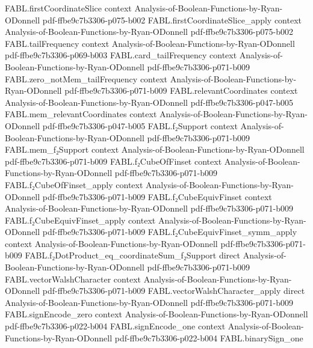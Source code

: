 \begin{theorem}
\proofstep
  {FABL.firstCoordinateSlice}
  {context}
  {Analysis-of-Boolean-Functions-by-Ryan-ODonnell}
  {pdf-ffbe9c7b3306-p075-b002}
\proofstep
  {FABL.firstCoordinateSlice_apply}
  {context}
  {Analysis-of-Boolean-Functions-by-Ryan-ODonnell}
  {pdf-ffbe9c7b3306-p075-b002}
\proofstep
  {FABL.tailFrequency}
  {context}
  {Analysis-of-Boolean-Functions-by-Ryan-ODonnell}
  {pdf-ffbe9c7b3306-p069-b003}
\proofstep
  {FABL.card_tailFrequency}
  {context}
  {Analysis-of-Boolean-Functions-by-Ryan-ODonnell}
  {pdf-ffbe9c7b3306-p071-b009}
\proofstep
  {FABL.zero_notMem_tailFrequency}
  {context}
  {Analysis-of-Boolean-Functions-by-Ryan-ODonnell}
  {pdf-ffbe9c7b3306-p071-b009}
\proofstep
  {FABL.relevantCoordinates}
  {context}
  {Analysis-of-Boolean-Functions-by-Ryan-ODonnell}
  {pdf-ffbe9c7b3306-p047-b005}
\proofstep
  {FABL.mem_relevantCoordinates}
  {context}
  {Analysis-of-Boolean-Functions-by-Ryan-ODonnell}
  {pdf-ffbe9c7b3306-p047-b005}
\proofstep
  {FABL.f₂Support}
  {context}
  {Analysis-of-Boolean-Functions-by-Ryan-ODonnell}
  {pdf-ffbe9c7b3306-p071-b009}
\proofstep
  {FABL.mem_f₂Support}
  {context}
  {Analysis-of-Boolean-Functions-by-Ryan-ODonnell}
  {pdf-ffbe9c7b3306-p071-b009}
\proofstep
  {FABL.f₂CubeOfFinset}
  {context}
  {Analysis-of-Boolean-Functions-by-Ryan-ODonnell}
  {pdf-ffbe9c7b3306-p071-b009}
\proofstep
  {FABL.f₂CubeOfFinset_apply}
  {context}
  {Analysis-of-Boolean-Functions-by-Ryan-ODonnell}
  {pdf-ffbe9c7b3306-p071-b009}
\proofstep
  {FABL.f₂CubeEquivFinset}
  {context}
  {Analysis-of-Boolean-Functions-by-Ryan-ODonnell}
  {pdf-ffbe9c7b3306-p071-b009}
\proofstep
  {FABL.f₂CubeEquivFinset_apply}
  {context}
  {Analysis-of-Boolean-Functions-by-Ryan-ODonnell}
  {pdf-ffbe9c7b3306-p071-b009}
\proofstep
  {FABL.f₂CubeEquivFinset_symm_apply}
  {context}
  {Analysis-of-Boolean-Functions-by-Ryan-ODonnell}
  {pdf-ffbe9c7b3306-p071-b009}
\proofstep
  {FABL.f₂DotProduct_eq_coordinateSum_f₂Support}
  {direct}
  {Analysis-of-Boolean-Functions-by-Ryan-ODonnell}
  {pdf-ffbe9c7b3306-p071-b009}
\proofstep
  {FABL.vectorWalshCharacter}
  {context}
  {Analysis-of-Boolean-Functions-by-Ryan-ODonnell}
  {pdf-ffbe9c7b3306-p071-b009}
\proofstep
  {FABL.vectorWalshCharacter_apply}
  {direct}
  {Analysis-of-Boolean-Functions-by-Ryan-ODonnell}
  {pdf-ffbe9c7b3306-p071-b009}
\proofstep
  {FABL.signEncode_zero}
  {context}
  {Analysis-of-Boolean-Functions-by-Ryan-ODonnell}
  {pdf-ffbe9c7b3306-p022-b004}
\proofstep
  {FABL.signEncode_one}
  {context}
  {Analysis-of-Boolean-Functions-by-Ryan-ODonnell}
  {pdf-ffbe9c7b3306-p022-b004}
\proofstep
  {FABL.binarySign_one}

\end{theorem}
